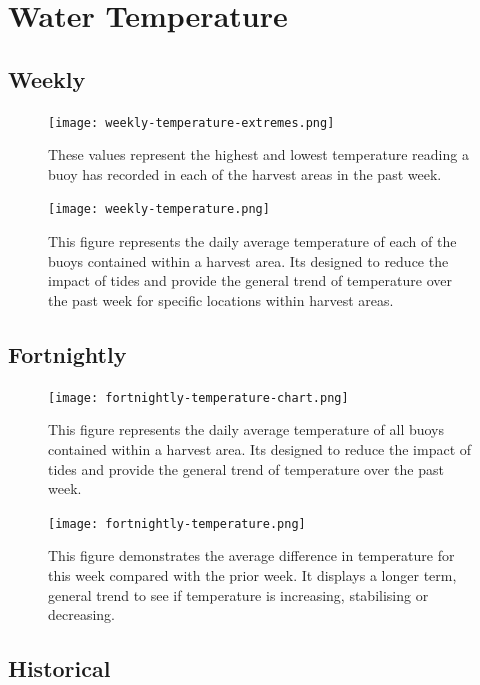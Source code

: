 \documentclass[10pt]{article}
\begin{document}
\pagebreak

\newpage
\section{Water Temperature}
\subsection{Weekly}

\begin{figure}[H]
\centering
\texttt{[image: weekly-temperature-extremes.png]}
\caption[Weekly Minimum and Maximum Temperature]{These values represent the highest and lowest temperature reading a buoy has recorded in each of the harvest areas in the past week.}
\end{figure}

\begin{figure}[H]
\centering
\texttt{[image: weekly-temperature.png]}
\caption[Average Weekly Temperature Table]{This figure represents the daily average temperature of each of the buoys contained within a harvest area. Its designed to reduce the impact of tides and provide the general trend of temperature over the past week for specific locations within harvest areas.}
\end{figure}

\subsection{Fortnightly}

\begin{figure}[H]
\centering
\texttt{[image: fortnightly-temperature-chart.png]}
\caption[Average Fortnightly Temperature Chart]{This figure represents the daily average temperature of all buoys contained within a harvest area. Its designed to reduce the impact of tides and provide the general trend of temperature over the past week.}
\end{figure}

\begin{figure}[H]
\centering
\texttt{[image: fortnightly-temperature.png]}
\caption[Average Fortnightly Temperature Difference]{This figure demonstrates the average difference in temperature for this week compared with the prior week. It displays a longer term, general trend to see if temperature is increasing, stabilising or decreasing.}
\end{figure}

\subsection{Historical}
\end{document}
